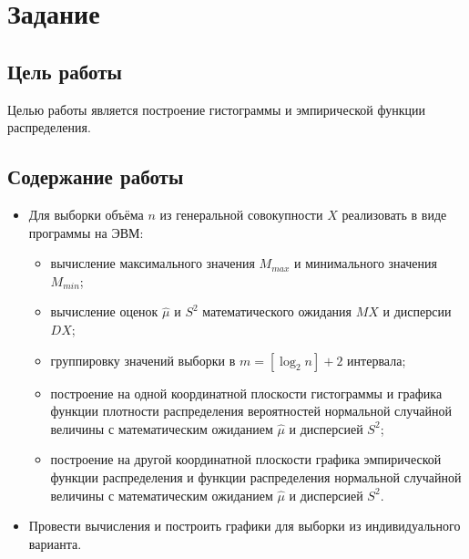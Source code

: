 \section{Задание}
\subsection{Цель работы}
Целью работы является построение гистограммы и эмпирической
функции распределения.

\subsection{Содержание работы}
\begin{itemize}
    \item Для выборки объёма \( n \) из генеральной совокупности \( X \) 
        реализовать в виде программы на ЭВМ:
        \begin{itemize}
            \item вычисление максимального значения \( M_{max}  \) и минимального 
                значения \( M_{min} \);
            \item вычисление оценок \( \hat{\mu} \) и \( S^2 \) математического 
                ожидания \( MX \) и дисперсии \( DX \);
            \item группировку значений выборки в \( m = [\log_2 n] + 2 \) интервала;
            \item построение на одной координатной плоскости гистограммы и графика 
            функции плотности распределения вероятностей нормальной случайной величины с
            математическим ожиданием \( \hat{\mu}  \)  и дисперсией \( S^2 \);
            \item построение на другой координатной плоскости графика эмпирической 
            функции распределения и функции распределения нормальной случайной величины с
            математическим ожиданием \( \hat{\mu}  \)  и дисперсией \( S^2 \).
        \end{itemize}
        \item Провести вычисления и построить графики для выборки из индивидуального варианта.
\end{itemize}